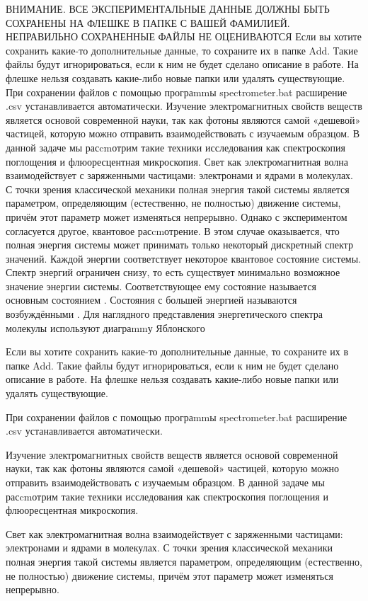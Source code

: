 \documentclass[11pt,a4paper]{article}
\begin{document}
ВНИМАНИЕ. ВСЕ ЭКСПЕРИМЕНТАЛЬНЫЕ ДАННЫЕ ДОЛЖНЫ БЫТЬ СОХРАНЕНЫ НА ФЛЕШКЕ В ПАПКЕ С ВАШЕЙ ФАМИЛИЕЙ. НЕПРАВИЛЬНО СОХРАНЕННЫЕ ФАЙЛЫ НЕ ОЦЕНИВАЮТСЯ Если вы хотите сохранить какие-то дополнительные данные, то сохраните их в папке Add. Такие файлы будут игнорироваться, если к ним не будет сделано описание в работе. На флешке нельзя создавать какие-либо новые папки или удалять существующие. При сохранении файлов с помощью програmmы spectrometer.bat расширение .csv устанавливается автоматически. Изучение электромагнитных свойств веществ является основой современной науки, так как фотоны являются самой «дешевой» частицей, которую можно отправить взаимодействовать с изучаемым образцом. В данной задаче мы расcmотрим такие техники исследования как спектроскопия поглощения и флюоресцентная микроскопия. Свет как электромагнитная волна взаимодействует с заряженными частицами: электронами и ядрами в молекулах. С точки зрения классической механики полная энергия такой системы является параметром, определяющим (естественно, не полностью) движение системы, причём этот параметр может изменяться непрерывно. Однако с экспериментом согласуется другое, квантовое расcmотрение. В этом случае оказывается, что полная энергия системы может принимать только некоторый дискретный спектр значений. Каждой энергии соответствует некоторое квантовое состояние системы. Спектр энергий ограничен снизу, то есть существует минимально возможное значение энергии системы. Соответствующее ему состояние называется основным состоянием . Состояния с большей энергией называются возбуждёнными . Для наглядного представления энергетического спектра молекулы используют диаграmmу Яблонского

Если вы хотите сохранить какие-то дополнительные данные, то сохраните их в папке Add. Такие файлы будут игнорироваться, если к ним не будет сделано описание в работе. На флешке нельзя создавать какие-либо новые папки или удалять существующие.

При сохранении файлов с помощью програmmы spectrometer.bat расширение .csv устанавливается автоматически.

Изучение электромагнитных свойств веществ является основой современной науки, так как фотоны являются самой «дешевой» частицей, которую можно отправить взаимодействовать с изучаемым образцом. В данной задаче мы расcmотрим такие техники исследования как спектроскопия поглощения и флюоресцентная микроскопия.

Свет как электромагнитная волна взаимодействует с заряженными частицами: электронами и ядрами в молекулах. С точки зрения классической механики полная энергия такой системы является параметром, определяющим (естественно, не полностью) движение системы, причём этот параметр может изменяться непрерывно.
\end{document}
